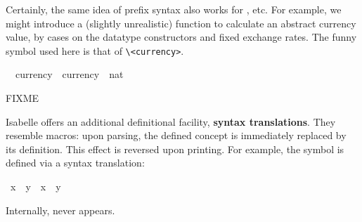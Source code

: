 \begin{isabellebody}
\begin{isamarkuptext}
  \medskip Certainly, the same idea of prefix syntax also works for
  ,  etc.  For example, we
  might introduce a (slightly unrealistic) function to calculate an
  abstract currency value, by cases on the datatype constructors and
  fixed exchange rates.  The funny symbol used here is that of
  \verb,\<currency>,.%
\end{isamarkuptext}%
\isamarkuptrue%
\isanewline
\ \ currency\ {\isacharcolon}{\isacharcolon}\ {\isachardoublequote}currency\ {\isasymRightarrow}\ nat{\isachardoublequote}\ \ \ \ {\isacharparenleft}{\isachardoublequote}{\isasymcurrency}{\isachardoublequote}{\isacharparenright}\isamarkupfalse%
%
\isamarkuptrue%
%
\begin{isamarkuptext}%
FIXME

%
Isabelle offers an additional definitional facility,
\textbf{syntax translations}.
They resemble macros: upon parsing, the defined concept is immediately
replaced by its definition.  This effect is reversed upon printing.  For example,
the symbol \isa{{\isasymnoteq}} is defined via a syntax translation:%
\end{isamarkuptext}%
\isamarkuptrue%
\ {\isachardoublequote}x\ {\isasymnoteq}\ y{\isachardoublequote}\ {\isasymrightleftharpoons}\ {\isachardoublequote}{\isasymnot}{\isacharparenleft}x\ {\isacharequal}\ y{\isacharparenright}{\isachardoublequote}\isamarkupfalse%
%
\begin{isamarkuptext}%
\noindent
Internally, \isa{{\isasymnoteq}} never appears.


\end{isamarkuptext}
\end{isabellebody}
